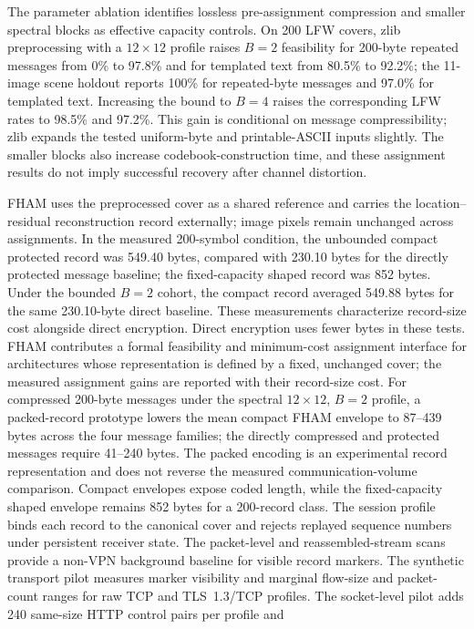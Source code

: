 \documentclass[preprint,12pt]{elsarticle}
\theoremstyle{plain}
\begin{document}
The parameter ablation identifies lossless pre-assignment compression and
smaller spectral blocks as effective capacity controls. On 200 LFW covers,
zlib preprocessing with a $12\times12$ profile raises $B=2$ feasibility for
200-byte repeated messages from 0\% to 97.8\% and for templated text from
80.5\% to 92.2\%; the 11-image scene holdout reports 100\% for repeated-byte
messages and 97.0\% for templated text. Increasing the bound to $B=4$ raises the corresponding LFW rates
to 98.5\% and 97.2\%. This gain is conditional on message compressibility;
zlib expands the tested uniform-byte and printable-ASCII inputs slightly.
The smaller blocks also increase codebook-construction time, and these
assignment results do not imply successful recovery after channel distortion.

FHAM uses the preprocessed cover as a shared reference and carries the
location--residual reconstruction record externally; image pixels remain
unchanged across assignments. In the measured 200-symbol condition, the
unbounded compact protected record was 549.40 bytes, compared with 230.10 bytes
for the directly protected message baseline; the fixed-capacity shaped record
was 852 bytes. Under the bounded $B=2$ cohort, the compact record averaged
549.88 bytes for the same 230.10-byte direct baseline. These measurements
characterize record-size cost alongside direct encryption. Direct encryption
uses fewer bytes in these tests. FHAM contributes a formal feasibility and
minimum-cost assignment interface for architectures whose representation is
defined by a fixed, unchanged cover; the measured assignment gains are reported
with their record-size cost.
For compressed 200-byte messages under the spectral $12\times12$, $B=2$
profile, a packed-record prototype lowers the mean compact FHAM envelope to
87--439 bytes across the four message families; the directly compressed and
protected messages require 41--240 bytes. The packed encoding is an
experimental record representation and does not reverse the measured
communication-volume comparison. Compact envelopes expose coded length, while
the fixed-capacity shaped envelope remains 852 bytes for a 200-record class.
The session profile binds each record to the canonical cover and rejects
replayed sequence numbers under persistent receiver state. The packet-level
and reassembled-stream scans provide a non-VPN background baseline for visible
record markers. The synthetic transport pilot measures marker visibility and
marginal flow-size and packet-count ranges for raw TCP and TLS~1.3/TCP profiles.
The socket-level pilot adds 240 same-size HTTP control pairs per profile and
\end{document}
